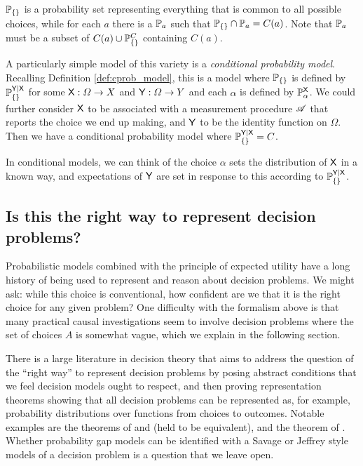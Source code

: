 $\mathbb{P}_{\{\}}$ is a probability set representing everything that is common to all possible choices, while for each $a$ there is a $\mathbb{P}_a$ such that $\mathbb{P}_{\{\}} \cap \mathbb{P}_a=C(a)$. Note that $\mathbb{P}_a$ must be a subset of $C(a)\cup \mathbb{P}_{\{\}}^C$ containing $C(a)$.

A particularly simple model of this variety is a \emph{conditional probability model}. Recalling Definition \ref{def:cprob_model}, this is a model where $\mathbb{P}_{\{\}}$ is defined by $\mathbb{P}_{\{\}}^{\mathsf{Y}|\mathsf{X}}$ for some $\mathsf{X}:\Omega\to X$ and $\mathsf{Y}:\Omega\to Y$ and each $\alpha$ is defined by $\mathbb{P}_\alpha^{\mathsf{X}}$. We could further consider $\mathsf{X}$ to be associated with a measurement procedure $\mathscr{A}$ that reports the choice we end up making, and $\mathsf{Y}$ to be the identity function on $\Omega$. Then we have a conditional probability model where $\mathbb{P}_{\{\}}^{\mathsf{Y}|\mathsf{X}}=C$.

In conditional models, we can think of the choice $\alpha$ sets the distribution of $\mathsf{X}$ in a known way, and expectations of $\mathsf{Y}$ are set in response to this according to $\mathbb{P}_{\{\}}^{\mathsf{Y}|\mathsf{X}}$.

\subsection{Is this the right way to represent decision problems?}

Probabilistic models combined with the principle of expected utility have a long history of being used to represent and reason about decision problems. We might ask: while this choice is conventional, how confident are we that it is the right choice for any given problem? One difficulty with the formalism above is that many practical causal investigations seem to involve decision problems where the set of choices $A$ is somewhat vague, which we explain in the following section.

There is a large literature in decision theory that aims to address the question of the ``right way'' to represent decision problems by posing abstract conditions that we feel decision models ought to respect, and then proving representation theorems showing that all decision problems can be represented as, for example, probability distributions over functions from choices to outcomes. Notable examples are the theorems of \citet{ramsey_truth_2016} and \citet{savage_foundations_1954} (held to be equivalent), and the theorem of \citet{bolker_functions_1966,jeffrey_logic_1990}. Whether probability gap models can be identified with a Savage or Jeffrey style models of a decision problem is a question that we leave open.

